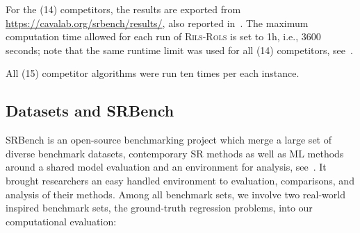 \documentclass[a4paper,12pt]{elsarticle}
\begin{document}
For the (14) competitors, the results are exported from \url{https://cavalab.org/srbench/results/}, also reported in~\cite{la2021contemporary}. 
The maximum computation time allowed for each run of \textsc{Rils}-\textsc{Rols} is set to 1h, i.e., 3600 seconds; note that the same runtime limit was used for all (14) competitors, see~\cite{la2021contemporary}. 
 

All (15) competitor algorithms were run ten times per each instance.  

 
\subsection{Datasets and SRBench}

SRBench is an open-source benchmarking project which merge a large set of diverse benchmark datasets, contemporary SR methods as well as ML methods around a shared model evaluation and an environment for analysis, see~\cite{la2021contemporary}. It brought researchers an easy handled environment to evaluation, comparisons, and analysis of their methods. Among all benchmark sets, we involve two real-world inspired benchmark sets, the ground-truth regression problems, into our computational evaluation: 
\end{document}
